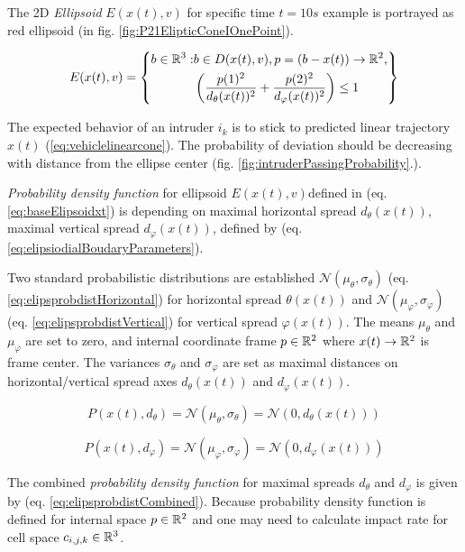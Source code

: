 The 2D \emph{Ellipsoid} $E({x}(t),{v})$ for specific time $t=10s$ example is portrayed  as red ellipsoid (in fig. \ref{fig:P21ElipticConeIOnePoint}).

\begin{equation}\label{eq:baseElipsoidxt}
    E({x}(t),{v})=\left\{ \begin{aligned}{b}\in\mathbb{R}^3:&{b}\in D({x}(t),{v}),{p}=({b}-{x}(t))\to\mathbb{R}^2,\\&\left(\frac{p(1)^2} {d_\theta({x}(t))^2}+ \frac{p(2)^2}{d_\varphi({x}(t))^2}\right)\le 1\end{aligned}\right\}
\end{equation}

\noindent The expected behavior of an intruder $i_k$ is to stick to predicted linear trajectory ${x}(t)$ (\ref{eq:vehiclelinearcone}). The probability of deviation should be decreasing with distance from the ellipse center (fig. \ref{fig:intruderPassingProbability}.).  


\noindent \emph{Probability density function} for ellipsoid  $E({x}(t),{v})$defined in (eq. \ref{eq:baseElipsoidxt}) is depending on maximal horizontal spread $d_\theta({x}(t))$, maximal vertical spread $d_\varphi({x}(t))$, defined by (eq. \ref{eq:elipsiodialBoudaryParameters}). 

Two standard probabilistic distributions are established $\mathscr{N}(\mu_\theta,\sigma_\theta)$ (eq. \ref{eq:elipsprobdistHorizontal}) for horizontal spread $\theta({x}(t))$ and $\mathscr{N}(\mu_\varphi,\sigma_\varphi)$  (eq. \ref{eq:elipsprobdistVertical}) for vertical spread $\varphi({x}(t))$. The means $\mu_\theta$ and $\mu_\varphi$ are set to zero, and internal coordinate frame ${p}\in\mathbb{R}^2$ where ${x}(t)\to\mathbb{R}^2$ is frame center. The variances $\sigma_\theta$ and $\sigma_\varphi$ are set as maximal distances on horizontal/vertical spread axes $d_\theta({x}(t))$ and $d_\varphi({x}(t))$.

\begin{equation}\label{eq:elipsprobdistHorizontal}
    P({x}(t),d_\theta)=\mathscr{N}(\mu_\theta,\sigma_\theta)=\mathscr{N}(0,d_\theta({x}(t)))
\end{equation}

\begin{equation}\label{eq:elipsprobdistVertical}
    P({x}(t),d_\varphi)=\mathscr{N}(\mu_\varphi,\sigma_\varphi)=\mathscr{N}(0,d_\varphi({x}(t)))
\end{equation}

\noindent The combined \emph{probability density function} for maximal spreads $d_\theta$ and $d_\varphi$ is given by (eq. \ref{eq:elipsprobdistCombined}). Because probability density function is defined for internal space ${p}\in\mathbb{R}^2$ and one may need to calculate impact rate for  cell space $c_{i,j,k}\in\mathbb{R}^3$. 

